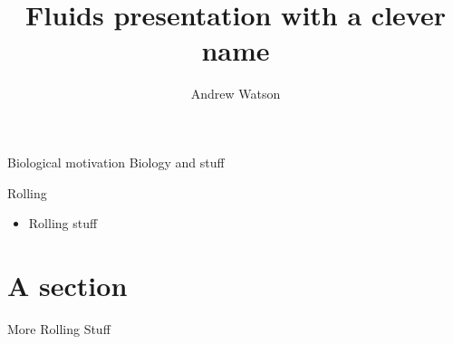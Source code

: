 \documentclass[10pt]{beamer}
\title{Fluids presentation with a clever name}
\date{}
\author{Andrew Watson}
\institute{University of Utah}
\begin{document}
\maketitle



\begin{frame}{Biological motivation}
Biology and stuff
\end{frame}

\begin{frame}{Rolling}
\begin{itemize}
\item Rolling stuff
\end{itemize}
\end{frame}

\section{A section}

\begin{frame}{More Rolling}
  Stuff
\end{frame}





\end{document}
